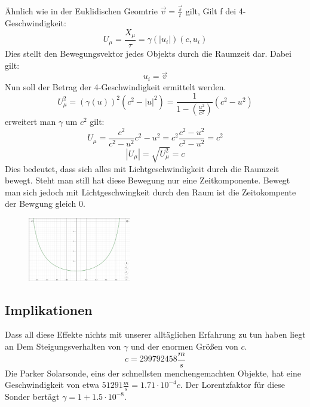 \documentclass[12pt]{article}
\begin{document}
Ähnlich wie in der Euklidischen Geomtrie $\vec{v} = \frac{\vec{s}}{t}$ gilt, Gilt f dei 4-Geschwindigkeit:
\begin{equation}
	U_\mu = \frac{X_\mu}{\tau} = \gamma(|u_i|) (c,u_i)
\end{equation}
Dies stellt den Bewegungsvektor jedes Objekts durch die Raumzeit dar.
Dabei gilt:
\begin{equation}
u_i = \vec{v}
\end{equation}
Nun soll der Betrag der 4-Geschwindigkeit ermittelt werden.
\begin{equation}
U_\mu ^2 = (\gamma(u))^2(c^2-|u|^2) = \frac{1}{1-(\frac{u^2}{c^2})} (c^2 - u^2)
\end{equation}
erweitert man $\gamma$ um $c^2$ gilt:
\begin{equation}
	U_\mu = \frac{c^2}{c^2 - u^2} c^2 - u^2 = c^2 \frac{c^2 - u^2}{c^2 - u^2} = c^2
\end{equation}
\begin{equation}
	|U_\mu| = \sqrt{U_\mu^2} = c
\end{equation}
Dies bedeutet, dass sich alles mit Lichtgeschwindigkeit durch die Raumzeit bewegt.
Steht man still hat diese Bewegung nur eine Zeitkomponente.
Bewegt man sich jedoch mit Lichtgeschwingkeit durch den Raum ist die Zeitokompente der Bewgung gleich 0.
\begin{figure}
\centering
\includegraphics[width=0.4\textwidth]{gamma.png}
\end{figure}
\subsection{Implikationen}
Dass all diese Effekte nichts mit unserer alltäglichen Erfahrung zu tun haben liegt an Dem Steigungsverhalten von $\gamma$ und der enormen Größen von $c$.
\begin{equation}
c = 299792458 \frac{m}{s}
\end{equation}
Die Parker Solarsonde, eins der schnellsten menchengemachten Objekte, hat eine Geschwindigkeit von etwa $51291 \frac{m}{s} = 1.71 \cdot 10^{-4} c$.
Der Lorentzfaktor für diese Sonder bertägt $\gamma = 1 + 1.5\cdot10^{-8}$.
\end{document}
